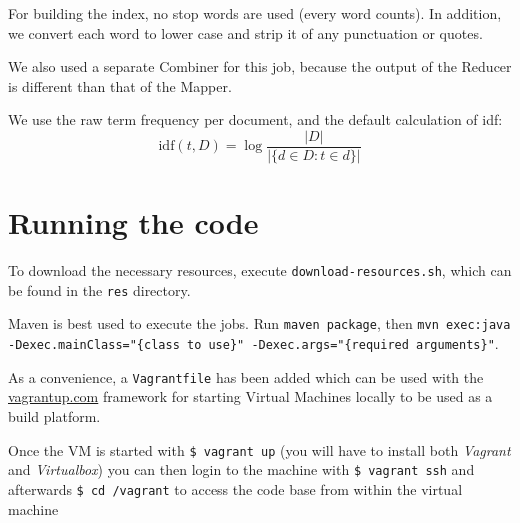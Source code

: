 \documentclass{article}
\begin{document}
For building the index, no stop words are used (every word counts). In addition, we convert each word to lower case
and strip it of any punctuation or quotes.

We also used a separate Combiner for this job, because the output of the Reducer is different than that of the Mapper.

We use the raw term frequency per document, and the default calculation of idf:
$$ \mathrm{idf}(t, D) = \log \frac{|D|}{|\{d \in D: t \in d\}|} $$

\section{Running the code}
To download the necessary resources, execute \texttt{download-resources.sh}, which can be
found in the \texttt{res} directory.

Maven is best used to execute the jobs. Run \texttt{maven package},
then \texttt{mvn exec:java -Dexec.mainClass="\{class to use\}" -Dexec.args="\{required arguments\}"}.

As a convenience, a \texttt{Vagrantfile} has been added which can be
used with the \url{vagrantup.com} framework for starting Virtual Machines
locally to be used as a build platform. 

Once the VM is started with \texttt{\$ vagrant up} (you will have to
install both \emph{Vagrant} and \emph{Virtualbox}) you can then login
to the machine with \texttt{\$ vagrant ssh} and afterwards \texttt{\$
  cd /vagrant} to access the code base from within the virtual machine 
\end{document}
